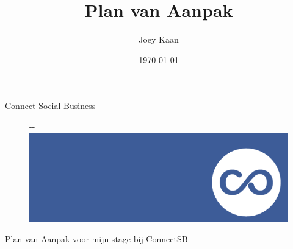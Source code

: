 \documentclass{article}
\title{Plan van Aanpak}
\author{Joey Kaan}
\date{\today}
\begin{document}

\begin{center}

{\Huge Connect Social Business\par}
\begin{figure}[!ht]
  \begin{adjustwidth}{-\oddsidemargin-1in}{-\rightmargin}
    \centering
    \includegraphics[width=\paperwidth]{connectsblogo}
  \end{adjustwidth}
\end{figure}

{\small Plan van Aanpak voor mijn stage bij ConnectSB\par}

\end{center}
\thispagestyle{empty}
\clearpage



\maketitle
\thispagestyle{empty}
\clearpage



\tableofcontents
\thispagestyle{empty}
\clearpage


\end{document}
